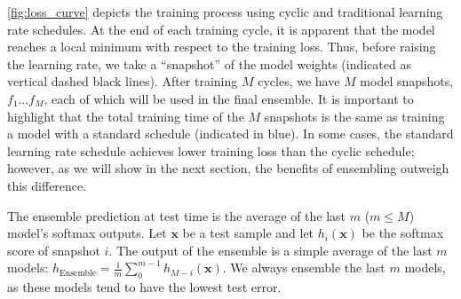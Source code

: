 \autoref{fig:loss_curve} depicts the training process using cyclic and traditional learning rate schedules. At the end of each training cycle, it  is apparent that the model reaches a local minimum with respect to the training loss. Thus, before raising the learning rate, we take a ``snapshot'' of the model weights (indicated as vertical dashed black lines). After training $M$ cycles, we have $M$ model snapshots, $f_1 \ldots f_M$, each of which will be used in the final ensemble. It is important to highlight that the total training time of the $M$ snapshots is the same as training a model with a standard schedule (indicated in blue). In some cases, the standard learning rate schedule achieves lower training loss than the cyclic schedule; however, as we will show in the next section, the benefits of ensembling outweigh this difference.

The ensemble prediction at test time is the average of the last $m$ ($m \leq M$) model's softmax outputs. Let $\mathbf{x}$ be a test sample and let $h_i \left( \mathbf{x} \right)$ be the softmax score of snapshot $i$. The output of the ensemble is a simple average of the last $m$ models:
%
$
  h_{\text{Ensemble}} = \frac{1}{m} \sum_{0}^{m-1} h_{M-i} \left( \mathbf{x} \right).
$
%
We always ensemble the last $m$ models, as these models tend to have the lowest test error.






